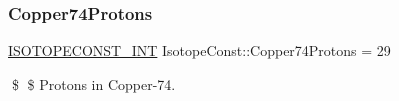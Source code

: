 \subsubsection{\texorpdfstring{Copper74\+Protons}{Copper74Protons}}
{\footnotesize\ttfamily \mbox{\hyperlink{group___isotope_const-_macros_ga5f18360b3e99483a35c32d789e62621c}{I\+S\+O\+T\+O\+P\+E\+C\+O\+N\+S\+T\+\_\+\+I\+NT}} Isotope\+Const\+::\+Copper74\+Protons = 29}

\$ \$ Protons in Copper-\/74. 